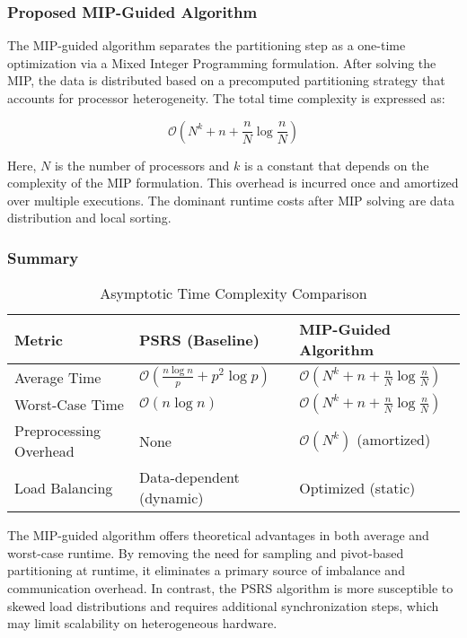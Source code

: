 \documentclass[]{interact}
\theoremstyle{plain}
\theoremstyle{definition}
\theoremstyle{remark}
\begin{document}
\subsubsection{Proposed MIP-Guided Algorithm}

The MIP-guided algorithm separates the partitioning step as a one-time optimization via a Mixed Integer Programming formulation. After solving the MIP, the data is distributed based on a precomputed partitioning strategy that accounts for processor heterogeneity. The total time complexity is expressed as:

\begin{equation}
    \mathcal{O}\left(N^k + n + \frac{n}{N} \log \frac{n}{N}\right)
\end{equation}

Here, $N$ is the number of processors and $k$ is a constant that depends on the complexity of the MIP formulation. This overhead is incurred once and amortized over multiple executions. The dominant runtime costs after MIP solving are data distribution and local sorting.

\subsubsection{Summary}

\begin{table}[H]
\centering
\caption{Asymptotic Time Complexity Comparison}
\begin{tabular}{l|l|l}
\toprule
\textbf{Metric} & \textbf{PSRS (Baseline)} & \textbf{MIP-Guided Algorithm} \\
\midrule
Average Time & $\mathcal{O}\left(\frac{n \log n}{p} + p^2 \log p\right)$ & $\mathcal{O}\left(N^k + n + \frac{n}{N} \log \frac{n}{N}\right)$ \\
Worst-Case Time & $\mathcal{O}(n \log n)$ & $\mathcal{O}\left(N^k + n + \frac{n}{N} \log \frac{n}{N}\right)$ \\
Preprocessing Overhead & None & $\mathcal{O}(N^k)$ (amortized) \\
Load Balancing & Data-dependent (dynamic) & Optimized (static) \\
\bottomrule
\end{tabular}
\end{table}


The MIP-guided algorithm offers theoretical advantages in both average and worst-case runtime. By removing the need for sampling and pivot-based partitioning at runtime, it eliminates a primary source of imbalance and communication overhead. In contrast, the PSRS algorithm is more susceptible to skewed load distributions and requires additional synchronization steps, which may limit scalability on heterogeneous hardware.
\end{document}
